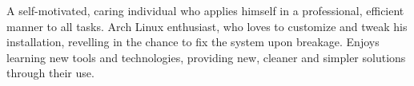 
\begin{cvparagraph}

A self-motivated, caring individual who applies himself in a professional, efficient manner to all tasks. Arch Linux enthusiast, who loves to customize and tweak his installation, revelling in the chance to fix the system upon breakage. Enjoys learning new tools and technologies, providing new, cleaner and simpler solutions through their use.
\end{cvparagraph}
